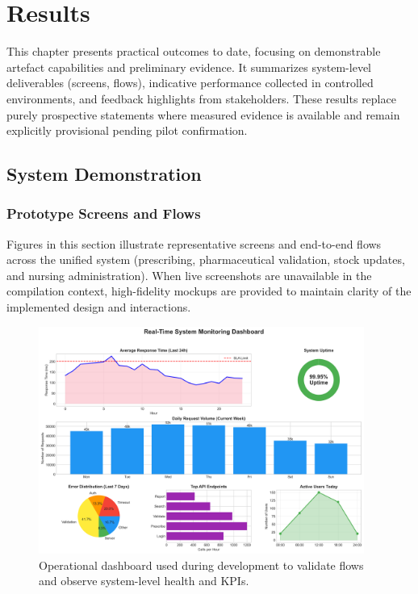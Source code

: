 \chapter{Results}
\label{chap:Results}

This chapter presents practical outcomes to date, focusing on demonstrable artefact capabilities and preliminary evidence. It summarizes system-level deliverables (screens, flows), indicative performance collected in controlled environments, and feedback highlights from stakeholders. These results replace purely prospective statements where measured evidence is available and remain explicitly provisional pending pilot confirmation.

\section{System Demonstration}

\subsection{Prototype Screens and Flows}
Figures in this section illustrate representative screens and end-to-end flows across the unified system (prescribing, pharmaceutical validation, stock updates, and nursing administration). When live screenshots are unavailable in the compilation context, high-fidelity mockups are provided to maintain clarity of the implemented design and interactions.

\begin{figure}[htbp]
    \centering
    \includegraphics[width=0.95\textwidth]{images/generated/monitoring_dashboard.png}
    \caption{Operational dashboard used during development to validate flows and observe system-level health and KPIs.}
    \label{fig:monitoring_dashboard}
\end{figure}

